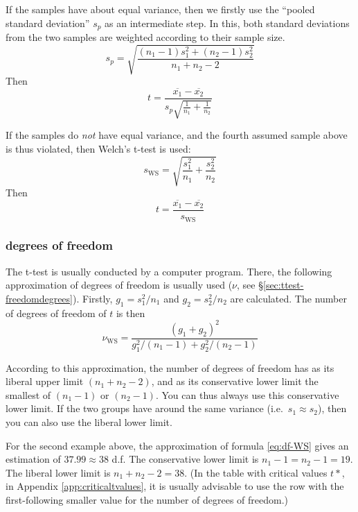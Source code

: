 \documentclass[
]{book}
\begin{document}
If the samples have about equal variance, then we firstly use
the ``pooled standard deviation'' \(s_p\) as an intermediate step. In this, both
standard deviations from the two samples are weighted according
to their sample size.
\begin{equation}
    s_p = \sqrt{ \frac{(n_1-1) s^2_1 + (n_2-1) s^2_2} {n_1+n_2-2} }
    \label{eq:sd-pooled}
\end{equation}
Then
\begin{equation}
  \label{eq:t-homoskedastic}
  t = \frac{ \overline{x_1}-\overline{x_2} } { s_p \sqrt{\frac{1}{n_1}+\frac{1}{n_2}} }
\end{equation}

If the samples do \emph{not} have equal variance, and the fourth assumed
sample above is thus violated, then Welch's t-test is
used:
\begin{equation}
  \label{eq:sd-WS}
  s_{\textrm{WS}} = \sqrt{\frac{s^2_1}{n_1}+\frac{s^2_2}{n_2} }
\end{equation}
Then
\begin{equation}
  \label{eq:t-WS}
  t = \frac{ \overline{x_1}-\overline{x_2} } { s_{\textrm{WS}} }
\end{equation}

\hypertarget{freedomdegrees}{%
\subsubsection{degrees of freedom}\label{freedomdegrees}}

The t-test is usually conducted by a computer program. There,
the following approximation of degrees of freedom is usually used
(\(\nu\), see §\ref{sec:ttest-freedomdegrees}).
Firstly, \(g_1=s^2_1/n_1\)
and \(g_2=s^2_2/n_2\) are calculated. The number of degrees of freedom of \(t\) is then
\begin{equation}
  \label{eq:df-WS}
  \nu_\textrm{WS} = 
        \frac {(g_1+g_2)^2} {g^2_1/(n_1-1) + g^2_2/(n_2-1)}
\end{equation}

According to this approximation, the number of degrees of freedom has as its liberal
upper limit \((n_1+n_2-2)\), and as its conservative lower limit the smallest
of \((n_1-1)\) or \((n_2-1)\). You can thus always use this conservative
lower limit. If the two groups have around the same variance
(i.e.~\(s_1 \approx s_2\)), then you can also use the liberal lower
limit.

For the second example above, the approximation of formula
\eqref{eq:df-WS} gives
an estimation of \(37.99 \approx 38\) d.f. The conservative lower limit is
\(n_1-1 = n_2-1 = 19\). The liberal lower limit is \(n_1+n_2 -2 = 38\). (In
the table with critical values \(t*\), in
Appendix \ref{app:criticaltvalues}, it is usually advisable to use the row
with the first-following smaller value for the number of
degrees of freedom.)
\end{document}

